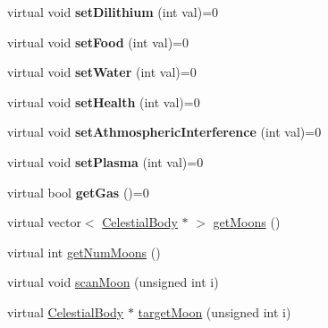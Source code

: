 \begin{DoxyCompactItemize}
\item 
\hypertarget{classCelestialBody_a8cd8dbd4e5a4d3caba0027d53a793495}{
virtual void {\bfseries setDilithium} (int val)=0}
\label{d4/d0b/classCelestialBody_a8cd8dbd4e5a4d3caba0027d53a793495}

\item 
\hypertarget{classCelestialBody_a8e56861f9b6e875aa48f15f37caeabc2}{
virtual void {\bfseries setFood} (int val)=0}
\label{d4/d0b/classCelestialBody_a8e56861f9b6e875aa48f15f37caeabc2}

\item 
\hypertarget{classCelestialBody_a762065cd0a5690bc94107b6a90bab584}{
virtual void {\bfseries setWater} (int val)=0}
\label{d4/d0b/classCelestialBody_a762065cd0a5690bc94107b6a90bab584}

\item 
\hypertarget{classCelestialBody_ab45bbf0a8775c538e2a0ee21b67fdac9}{
virtual void {\bfseries setHealth} (int val)=0}
\label{d4/d0b/classCelestialBody_ab45bbf0a8775c538e2a0ee21b67fdac9}

\item 
\hypertarget{classCelestialBody_a5b74f1050aeb75f9031e965c491c884d}{
virtual void {\bfseries setAthmosphericInterference} (int val)=0}
\label{d4/d0b/classCelestialBody_a5b74f1050aeb75f9031e965c491c884d}

\item 
\hypertarget{classCelestialBody_ab5806c7f2a6f1feeeaceb88eb5685ab0}{
virtual void {\bfseries setPlasma} (int val)=0}
\label{d4/d0b/classCelestialBody_ab5806c7f2a6f1feeeaceb88eb5685ab0}

\item 
\hypertarget{classCelestialBody_af729a04451951829bf586148f1c29d95}{
virtual bool {\bfseries getGas} ()=0}
\label{d4/d0b/classCelestialBody_af729a04451951829bf586148f1c29d95}

\item 
virtual vector$<$ \hyperlink{classCelestialBody}{CelestialBody} $\ast$ $>$ \hyperlink{classCelestialBody_a6c9db5c520596bc85a2e2a461db4b2c8}{getMoons} ()
\item 
virtual int \hyperlink{classCelestialBody_ae41a354c4b3345c7558c9691bc7c239e}{getNumMoons} ()
\item 
virtual void \hyperlink{classCelestialBody_a6e7b86fa71d74ad29e2434c4715b5608}{scanMoon} (unsigned int i)
\item 
virtual \hyperlink{classCelestialBody}{CelestialBody} $\ast$ \hyperlink{classCelestialBody_a7919f1dba305a225978fa901a34daf25}{targetMoon} (unsigned int i)
\end{DoxyCompactItemize}
